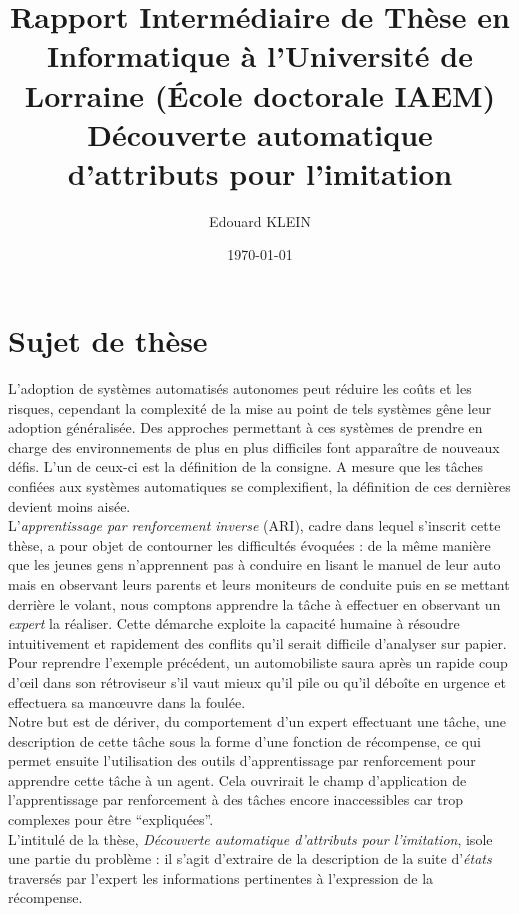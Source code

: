 \documentclass[11pt]{article}
\title{Rapport Intermédiaire de Thèse en Informatique à l'Université de Lorraine (\'Ecole doctorale IAEM)\\
Découverte automatique d'attributs pour l'imitation}
\author{Edouard KLEIN}
\date{\today}
\begin{document}
\maketitle
\section*{Sujet de thèse}
L'adoption de systèmes automatisés autonomes peut réduire les coûts et les risques, cependant la complexité de la mise au point de tels systèmes gêne leur adoption généralisée. Des approches permettant à ces systèmes de prendre en charge des environnements de plus en plus difficiles font apparaître de nouveaux défis. L'un de ceux-ci est la définition de la consigne. A mesure que les tâches confiées aux systèmes automatiques se complexifient, la définition de ces dernières devient moins aisée.\\

  L'\emph{apprentissage par renforcement inverse} (ARI), cadre dans lequel s'inscrit cette thèse, a pour objet de contourner les difficultés évoquées : de la même manière que les jeunes gens n'apprennent pas à conduire en lisant le manuel de leur auto mais en observant leurs parents et leurs moniteurs de conduite puis en se mettant derrière le volant, nous comptons apprendre la tâche à effectuer en observant un \emph{expert} la réaliser. Cette démarche exploite la capacité humaine à résoudre intuitivement et rapidement des conflits qu'il serait difficile d'analyser sur papier. Pour reprendre l'exemple précédent, un automobiliste saura après un rapide coup d'œil dans son rétroviseur s'il vaut mieux qu'il pile ou qu'il déboîte en urgence et effectuera sa manœuvre dans la foulée.\\

  Notre but est de dériver, du comportement d'un expert effectuant une tâche, une description de cette tâche sous la forme d'une fonction de récompense, ce qui permet ensuite l'utilisation des outils d'apprentissage par renforcement pour apprendre cette tâche à un agent. Cela ouvrirait le champ d'application de l'apprentissage par renforcement à des tâches encore inaccessibles car trop complexes pour être ``expliquées''.\\
  L'intitulé de la thèse, \emph{Découverte automatique d'attributs pour l'imitation}, isole une partie du problème : il s'agit d'extraire de la description de la suite d'\emph{états} traversés par l'expert les informations pertinentes à l'expression de la récompense.\\
\end{document}
